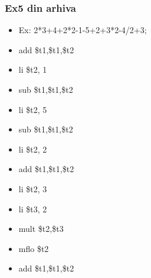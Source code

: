\documentclass[pdf]{beamer}
\begin{document}
\begin{frame}[shrink=20]
\frametitle{Ex5 din arhiva}
\begin{itemize}
\item \vspace{5mm}
Ex: 2*3+4+2*2-1-5+2+3*2-4/2+3;
\item \quad \vspace{5mm}
	add \hspace{6mm} \$t1,\$t1,\$t2
\item \quad 
	li \hspace{10mm} \$t2, 1
\item \quad \vspace{5mm}
	sub \hspace{6.5mm} \$t1,\$t1,\$t2
\item \quad 
	li \hspace{10mm} \$t2, 5
\item \quad \vspace{5mm}
	sub \hspace{6.5mm} \$t1,\$t1,\$t2
\item \quad 
	li \hspace{10mm} \$t2, 2
\item \quad \vspace{5mm}
	add \hspace{6mm} \$t1,\$t1,\$t2
\item \quad 
	li \hspace{10mm} \$t2, 3
\item \quad
	li \hspace{10mm} \$t3, 2
\item \quad
	mult \hspace{4.5mm} \$t2,\$t3
\item \quad \vspace{5mm}
	mflo \hspace{4.8mm}  \$t2
\item \quad 
	add	\hspace{6mm} \$t1,\$t1,\$t2
\end{itemize}
\end{frame}
\end{document}
